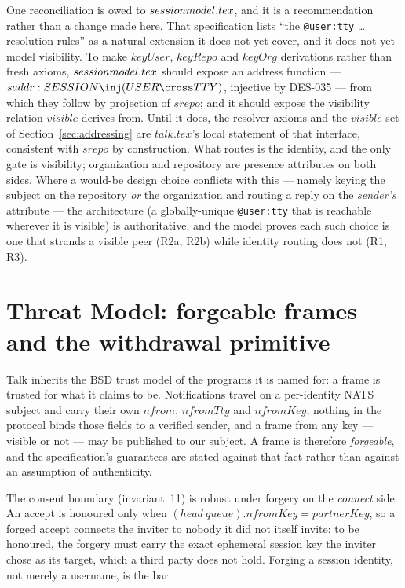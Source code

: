 \documentclass[a4paper,10pt,fleqn]{article}
\begin{document}
One reconciliation is owed to $session\-model.tex$, and it is a
recommendation rather than a change made here.  That specification lists
``the \texttt{@user:tty} \ldots resolution rules'' as a natural
extension it does not yet cover, and it does not yet model visibility.
To make $keyUser$, $keyRepo$ and $keyOrg$ derivations rather than fresh
axioms, $session\-model.tex$ should expose an address function ---
$saddr : SESSION \inj (USER \cross TTY)$, injective by DES-035 --- from
which they follow by projection of $srepo$; and it should expose the
visibility relation $visible$ derives from.  Until it does, the resolver
axioms and the $visible$ set of Section~\ref{sec:addressing} are
$talk.tex$'s local statement of that interface, consistent with $srepo$
by construction.  What routes is the identity, and the only gate is
visibility; organization and repository are presence attributes on both
sides.  Where a would-be design choice conflicts with this --- namely
keying the subject on the repository \emph{or} the organization and
routing a reply on the \emph{sender's} attribute --- the architecture
(a globally-unique \texttt{@user:tty} that is reachable wherever it is
visible) is authoritative, and the model proves each such choice is one
that strands a visible peer (R2a, R2b) while identity routing does not
(R1, R3).

\section{Threat Model: forgeable frames and the withdrawal primitive}
\label{sec:threat}

Talk inherits the BSD trust model of the programs it is named for: a frame
is trusted for what it claims to be.  Notifications travel on a per-identity
NATS subject and carry their own $nfrom$, $nfromTty$ and $nfromKey$;
nothing in the protocol binds those fields to a verified sender, and a frame
from any key --- visible or not --- may be published to our subject.  A frame
is therefore \emph{forgeable}, and the specification's guarantees are stated
against that fact rather than against an assumption of authenticity.

The consent boundary (invariant~11) is robust under forgery on the
\emph{connect} side.  An accept is honoured only when
$(head~queue).nfromKey = partnerKey$, so a forged accept connects the inviter
to nobody it did not itself invite: to be honoured, the forgery must carry
the exact ephemeral session key the inviter chose as its target, which a
third party does not hold.  Forging a session identity, not merely a
username, is the bar.
\end{document}
